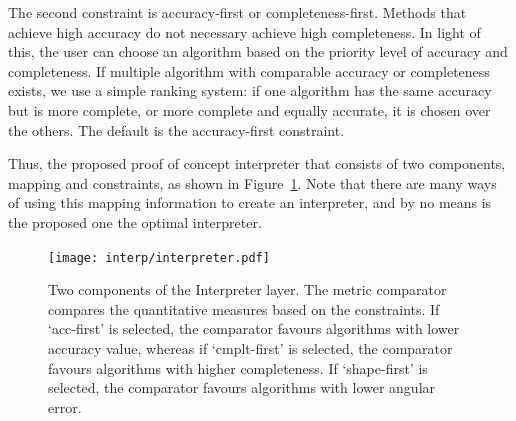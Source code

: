 The second constraint is accuracy-first or completeness-first. Methods that achieve high accuracy do not necessary achieve high completeness. In light of this, the user can choose an algorithm based on the priority level of accuracy and completeness. If multiple algorithm with comparable accuracy or completeness exists, we use a simple ranking system: if one algorithm has the same accuracy but is more complete, or more complete and equally accurate, it is chosen over the others. The default is the accuracy-first constraint.

Thus, the proposed proof of concept interpreter that consists of two components, mapping and constraints, as shown in Figure~\ref{fig:interpreter}. Note that there are many ways of using this mapping information to create an interpreter, and by no means is the proposed one the optimal interpreter. 
\begin{figure}[!htbp]
\centering
\texttt{[image: interp/interpreter.pdf]}
\caption{Two components of the Interpreter layer. The metric comparator compares the quantitative measures based on the constraints. If `acc-first' is selected, the comparator favours algorithms with lower accuracy value, whereas if `cmplt-first' is selected, the comparator favours algorithms with higher completeness. If `shape-first' is selected, the comparator favours algorithms with lower angular error.}
\label{fig:interpreter}
\end{figure}




